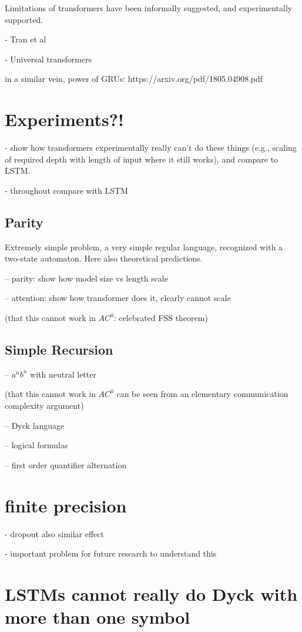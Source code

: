 \documentclass[11pt,a4paper]{article}
\newcounter{theorem}
\begin{document}
Limitations of transformers have been informally suggested, and experimentally supported.

- Tran et al

- Universal transformers

in a similar vein, power of GRUs: https://arxiv.org/pdf/1805.04908.pdf

\section{Experiments?!}

- show how transformers experimentally really can't do these things (e.g., scaling of required depth with length of input where it still works), and compare to LSTM.

- throughout compare with LSTM

\subsection{Parity}
Extremely simple problem, a very simple regular language, recognized with a two-state automaton.
Here also theoretical predictions.

-- parity: show how model size vs length scale

-- attention: show how transformer does it, clearly cannot scale

(that this cannot work in $AC^0$: celebrated FSS theorem)

\subsection{Simple Recursion}
-- $a^nb^n$ with neutral letter

(that this cannot work in $AC^0$ can be seen from an elementary communication complexity argument)

-- Dyck language

-- logical formulas

-- first order quantifier alternation

\section{finite precision}

- dropout also similar effect

- important problem for future research to understand this


\section{LSTMs cannot really do Dyck with more than one symbol}
\end{document}
